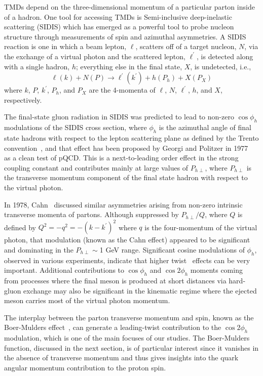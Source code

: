 \documentclass[aps,prl,twocolumn,showpacs,superscriptaddress,groupedaddress]{revtex4-1}  %
\newcommand{\Phperp}{P_{h\perp}}
\begin{document}
TMDs depend on the three-dimensional momentum of a particular parton inside of a hadron.
One tool for accessing TMDs is Semi-inclusive deep-inelastic scattering (SIDIS) which has emerged as a powerful tool to probe nucleon structure through measurements of spin and azimuthal asymmetries.
A SIDIS reaction is one in which a beam lepton, $\ell$, scatters off of a target nucleon, $N$, via the exchange of a virtual photon and the scattered lepton, $\ell^{\prime}$, is detected along with a single hadron, $h$; everything else in the final state, $X$, is undetected, i.e.,
\begin{equation}
\label{eq:sidis}
\ell (k) + N(P) \rightarrow \ell^{\prime} (k^{\prime} ) + h(P_{h}) + X(P_{X})
\end{equation}
where $k$, $P$, $k^{\prime}$, $P_{h}$, and $P_{X}$ are the 4-momenta of $\ell$, $N$, $\ell^{\prime}$, $h$, and $X$, respectively.

The final-state gluon radiation in SIDIS was predicted to lead to non-zero $\cos\phi_h$ modulations of the SIDIS cross section,
where $\phi_h$ is the azimuthal angle of final state hadrons with respect to the lepton scattering plane as defined by the Trento convention~\cite{Bacchetta:2004jz},
and that effect has been  proposed by Georgi and Politzer in  1977~\cite{Georgi:1977tv}  as a clean test of pQCD.
This is a next-to-leading order effect in the strong coupling constant and contributes mainly at large values of $\Phperp$, where $\Phperp$ is the transverse momentum component of the final state hadron with respect to the virtual photon.

In 1978, Cahn~\cite{Cahn:1978se}   discussed  similar asymmetries arising from non-zero intrinsic transverse momenta of partons.
Although suppressed by $P_{h\perp}/Q$, where $Q$ is defined by $Q^2 = -q^2 = -(k-k^\prime)^2$ where $q$ is the four-momentum of the virtual photon, that modulation (known as the Cahn effect) appeared to be significant and dominating in the $P_{h\perp} \sim $1 GeV range.
Significant cosine modulations of $\phi_h$, observed in various experiments, indicate that higher twist~\cite{Jaffe:1996zw} effects can be very important.
Additional contributions to $\cos \phi_h$ and $\cos 2\phi_h$ moments coming from processes where the final meson
is produced at short distances via hard-gluon exchange \cite{Berger:1979xz} may also be 
significant in the kinematic regime where the ejected meson carries  most of 
the virtual photon momentum.

The interplay between the parton transverse momentum and spin, known as the Boer-Mulders effect~\cite{Boer:1997nt}, can generate a leading-twist
contribution to the $\cos 2\phi_h$ modulation, which is one of the main focuses of our studies.
The Boer-Mulders function, discussed in the next section, is of particular interest since it vanishes in the absence of transverse momentum and thus gives insights into the quark angular momentum contribution to the proton spin.
\end{document}
